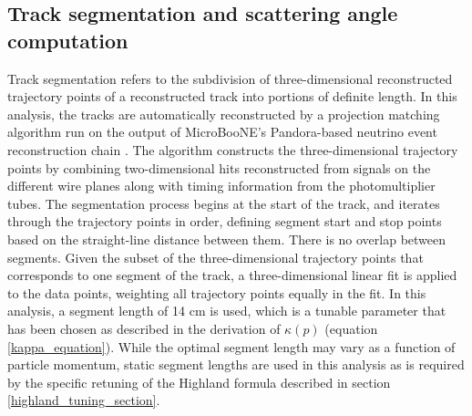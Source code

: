 \documentclass[a4paper,11pt]{article}
\begin{document}
\subsection{Track segmentation and scattering angle computation}\label{track_segmentation_and_scattering_angle_computation_section}

Track segmentation refers to the subdivision of three-dimensional reconstructed trajectory points of a reconstructed track into portions of definite length. In this analysis, the tracks are automatically reconstructed by a projection matching algorithm \cite{Antonello:2012hu} run on the output of MicroBooNE's Pandora-based neutrino event reconstruction chain \cite{Marshall:2015rfa}. The algorithm constructs the three-dimensional trajectory points by combining two-dimensional hits reconstructed from signals on the different wire planes along with timing information from the photomultiplier tubes. The segmentation process begins at the start of the track, and iterates through the trajectory points in order, defining segment start and stop points based on the straight-line distance between them. There is no overlap between segments. Given the subset of the three-dimensional trajectory points that corresponds to one segment of the track, a three-dimensional linear fit is applied to the data points, weighting all trajectory points equally in the fit. In this analysis, a segment length of 14 cm is used, which is a tunable parameter that has been chosen as described in the derivation of $\kappa(p)$ (equation \ref{kappa_equation}). While the optimal segment length may vary as a function of particle momentum, static segment lengths are used in this analysis as is required by the specific retuning of the Highland formula described in section \ref{highland_tuning_section}.\\
\end{document}

